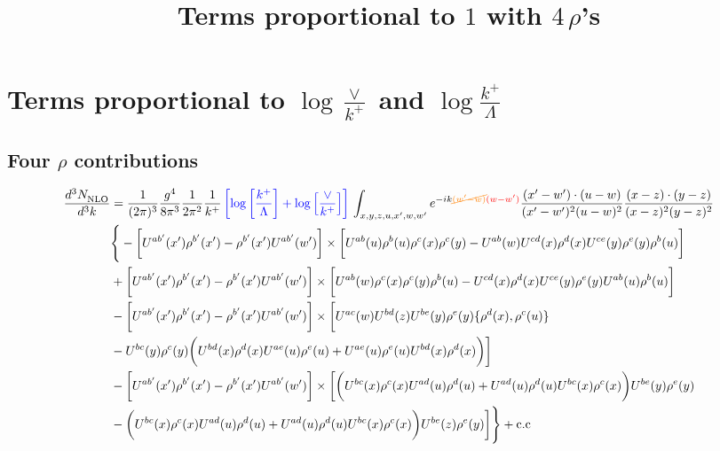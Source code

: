 \documentclass[aps,prd,amsmath,amssymb,nofootinbib]{revtex4-2}
\title{Terms proportional to $1$ with $4\, \rho$'s}
\numberwithin{equation}{section}
\begin{document}
\section{Terms proportional to $\log{\frac{\vee}{k^{+}}}$ and $\log{\frac{k^{+}}{\Lambda}}$}
\subsection{Four $\rho$ contributions}
\begin{align} \label{eq:4rho}
    \frac{d^{3}N_{\rm NLO}^{\rm}}{d^{3}k}  & = \frac{1}{(2\pi)^{3}}\frac{g^{4}}{8\pi^{3}}\frac{1}{2\pi^{2}} \frac{1}{k^{+}}\,{\color{blue}\left[\log{\left[\frac{k^{+}}{\Lambda}\right]}+\log{\left[\frac{\vee}{k^{+}}\right]}\right]}\,\int_{x,y,z,u,x^{\prime},w,w^{\prime}}e^{-ik{\color{orange}\cancel{(w^{\prime}-w)}}{\color{red}(w-w^{\prime})}}\frac{(x^{\prime}-w^{\prime})\cdot (u-w)}{(x^{\prime}-w^{\prime})^{2} (u-w)^{2}} \frac{(x-z)\cdot (y-z)}{(x-z)^{2}(y-z)^{2}}\notag \\ & \Bigg\{-\bigg[U^{ab^{\prime}}(x^{\prime})\rho^{b^{\prime}}(x^{\prime})-\rho^{b^{\prime}}(x^{\prime})U^{ab^{\prime}}(w^{\prime})\bigg]\times\bigg[U^{ab}(u)\rho^{b}(u)\rho^{c}(x)\rho^{c}(y)-U^{ab}(w)U^{cd}(x)\rho^{d}(x)U^{ce}(y)\rho^{e}(y)\rho^{b}(u)\bigg]\notag \\ & + \bigg[U^{ab^{\prime}}(x^{\prime})\rho^{b^{\prime}}(x^{\prime})-\rho^{b^{\prime}}(x^{\prime})U^{ab^{\prime}}(w^{\prime})\bigg]\times \bigg[U^{ab}(w)\rho^{c}(x)\rho^{c}(y)\rho^{b}(u)-U^{cd}(x)\rho^{d}(x)U^{ce}(y)\rho^{e}(y)U^{ab}(u)\rho^{b}(u)\bigg]\notag \\ & 
    -\bigg[U^{ab^{\prime}}(x^{\prime})\rho^{b^{\prime}}(x^{\prime})-\rho^{b^{\prime}}(x^{\prime})U^{ab^{\prime}}(w^{\prime})\bigg]\times \bigg[U^{ac}(w)U^{bd}(z)U^{be}(y)\rho^{e}(y)\{\rho^{d}(x),\rho^{c}(u)\}\notag \\ &-U^{bc}(y)\rho^{c}(y)\bigg(U^{bd}(x)\rho^{d}(x) U^{ae}(u)\rho^{e}(u)+U^{ae}(u)\rho^{e}(u)U^{bd}(x)\rho^{d}(x)\bigg)\bigg]\notag \\ & - \bigg[U^{ab^{\prime}}(x^{\prime})\rho^{b^{\prime}}(x^{\prime})-\rho^{b^{\prime}}(x^{\prime})U^{ab^{\prime}}(w^{\prime})\bigg]\times \bigg[\bigg(U^{bc}(x)\rho^{c}(x)U^{ad}(u)\rho^{d}(u)+U^{ad}(u)\rho^{d}(u)U^{bc}(x)\rho^{c}(x)\bigg)U^{be}(y)\rho^{e}(y)\notag \\ & -\bigg(U^{bc}(x)\rho^{c}(x)U^{ad}(u)\rho^{d}(u)+U^{ad}(u)\rho^{d}(u)U^{bc}(x)\rho^{c}(x)\bigg)U^{be}(z)\rho^{e}(y)\bigg]\Bigg\}+\rm{c.c} \notag \\ & 

\end{align}
\end{document}

